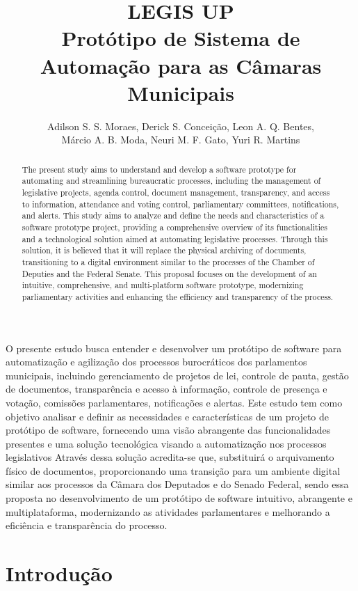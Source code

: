 \documentclass[12pt]{article}
\title{LEGIS UP\\ Protótipo de Sistema de Automação para as Câmaras Municipais}
\author{
	Adilson S. S. Moraes\inst{1}, 
	Derick S. Conceição\inst{1}, 
	Leon A. Q. Bentes\inst{1}, \\
	Márcio A. B. Moda\inst{1}, 
	Neuri M. F. Gato\inst{1}, 
	Yuri R. Martins\inst{1}
}
\begin{document}
  

\maketitle

\begin{abstract}
  The present study aims to understand and develop a software prototype for automating and streamlining bureaucratic processes, including the management of legislative projects, agenda control, document management, transparency, and access to information, attendance and voting control, parliamentary committees, notifications, and alerts. This study aims to analyze and define the needs and characteristics of a software prototype project, providing a comprehensive overview of its functionalities and a technological solution aimed at automating legislative processes. Through this solution, it is believed that it will replace the physical archiving of documents, transitioning to a digital environment similar to the processes of the Chamber of Deputies and the Federal Senate. This proposal focuses on the development of an intuitive, comprehensive, and multi-platform software prototype, modernizing parliamentary activities and enhancing the efficiency and transparency of the process.
\end{abstract}
     
\begin{resumo} 
  O presente estudo busca entender e desenvolver um protótipo de software para automatização e agilização dos processos burocráticos dos parlamentos municipais, incluindo gerenciamento de projetos de lei, controle de pauta, gestão de documentos, transparência e acesso à informação, controle de presença e votação, comissões parlamentares, notificações e alertas. Este estudo tem como objetivo analisar e definir as necessidades e características de um projeto de protótipo de software, fornecendo uma visão abrangente das funcionalidades presentes e uma solução tecnológica visando a automatização nos processos legislativos Através dessa solução acredita-se que, substituirá o arquivamento físico de documentos, proporcionando uma transição para um ambiente digital similar aos processos da Câmara dos Deputados e do Senado Federal, sendo essa proposta no desenvolvimento de um protótipo de software intuitivo, abrangente e multiplataforma, modernizando as atividades parlamentares e melhorando a eficiência e transparência do processo.
\end{resumo}


\section{Introdução}
\end{document}
